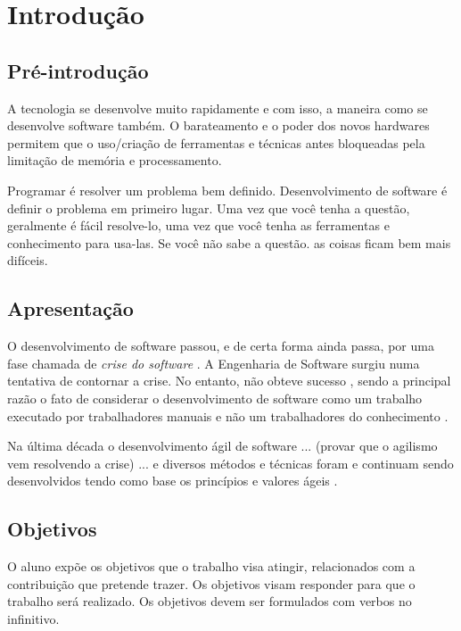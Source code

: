 \chapter{Introdução}

\section{Pré-introdução}

A tecnologia se desenvolve muito rapidamente e com isso, a maneira como se
desenvolve software também. O barateamento e o poder dos novos hardwares
permitem que o uso/criação de ferramentas e técnicas antes bloqueadas pela
limitação de memória e processamento.

Programar é resolver um problema bem definido. Desenvolvimento de software é
definir o problema em primeiro lugar. Uma vez que você tenha a questão,
geralmente é fácil resolve-lo, uma vez que você tenha as ferramentas e
conhecimento para usa-las. Se você não sabe a questão. as coisas ficam bem mais
difíceis. \cite{ProgrammingIsEasySoftwareDevelopmentIsHard}

\section{Apresentação}

O desenvolvimento de software passou, e de certa forma ainda passa, por uma fase
chamada de \emph{crise do software} \cite{HumbleProgrammer}. A Engenharia de
Software surgiu \cite{NaurRandell} numa tentativa de contornar a crise. No
entanto, não obteve sucesso \cite[37]{XPTeles}, sendo a principal razão o fato
de considerar o desenvolvimento de software como um trabalho executado por
trabalhadores manuais e não um trabalhadores do conhecimento \cite[38]{XPTeles}.

Na última década o desenvolvimento ágil de software \cite{AgileManifesto} ...
(provar que o agilismo vem resolvendo a crise) ...
e diversos métodos e técnicas foram e continuam sendo desenvolvidos tendo como
base os princípios e valores ágeis \cite{BDDRodrigo}.


\section{Objetivos}

O aluno expõe os objetivos que o trabalho visa atingir, relacionados com a
contribuição que pretende trazer. Os objetivos visam responder para que o
trabalho será realizado. Os objetivos devem ser formulados com verbos no
infinitivo.


